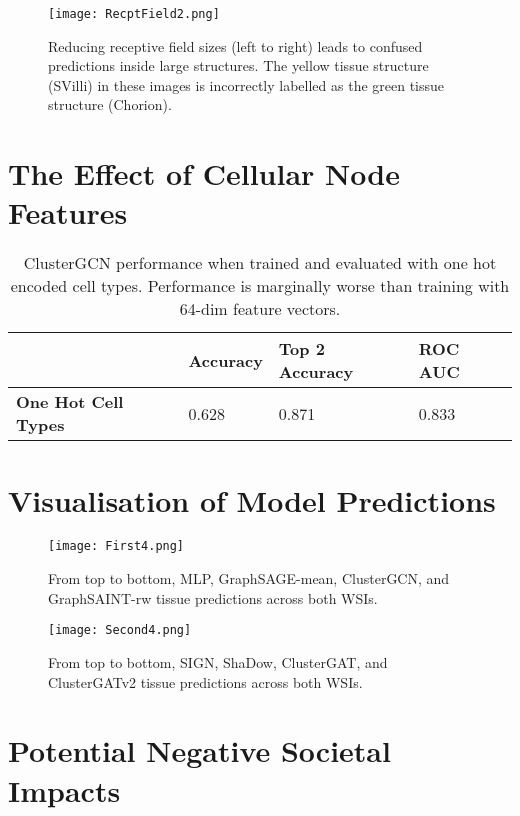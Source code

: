 \documentclass{article}
\begin{document}
\begin{figure}[h]
  \centering
  \texttt{[image: RecptField2.png]}
  \caption{Reducing receptive field sizes (left to right) leads to confused predictions inside large structures. The yellow tissue structure (SVilli) in these images is incorrectly labelled as the green tissue structure (Chorion).}
\end{figure}

\section{The Effect of Cellular Node Features}
\label{cell-features}

\begin{table}[!ht]
  \caption{ClusterGCN performance when trained and evaluated with one hot encoded cell types. Performance is marginally worse than training with 64-dim feature vectors.}
  \label{model-results-celltype-features}
  \centering
  \begin{tabular}{llll}
    \toprule
    & \textbf{Accuracy} & \textbf{Top 2 Accuracy} & \textbf{ROC AUC} \\
    \midrule
    \textbf{One Hot Cell Types} & 0.628 & 0.871 & 0.833 \\
    \bottomrule
  \end{tabular}
\end{table}

\pagebreak
\section{Visualisation of Model Predictions}
\label{vis-umap}


\begin{figure}[h]
  \centering
  \texttt{[image: First4.png]}
  \caption{From top to bottom, MLP, GraphSAGE-mean, ClusterGCN, and GraphSAINT-rw tissue predictions across both WSIs.}
\end{figure}

\pagebreak

\begin{figure}[h]
  \centering
  \texttt{[image: Second4.png]}
  \caption{From top to bottom, SIGN, ShaDow, ClusterGAT, and ClusterGATv2 tissue predictions across both WSIs.}
\end{figure}


\pagebreak
\section{Potential Negative Societal Impacts}
\label{negative-societal-impacts}
\end{document}
